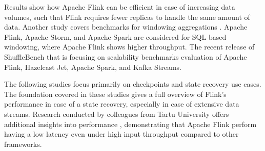 Results show how Apache Flink can be efficient in case of increasing data volumes,
such that Flink requires fewer replicas to handle the same amount of data.
Another study covers benchmarks for windowing aggregations \cite{dataSystemBenchmarks}.
Apache Flink, Apache Storm, and Apache Spark are considered for SQL-based windowing, where Apache Flink shows higher throughput.
The recent release of ShuffleBench \cite{Henning_2024} that is focusing on scalability
benchmarks evaluation of Apache Flink, Hazelcast Jet, Apache Spark, and Kafka Streams.

The following studies \cite{carbone2015lightweight} \cite{siachamis2024checkmate} focus
primarily on checkpoints and state recovery use cases.
The foundation covered in these studies gives a full overview of Flink's performance in
case of a state recovery, especially in case of extensive data streams.
Research conducted by colleagues from Tartu University offers additional insights into performance \cite{benchmarks_big_data},
demonstrating that Apache Flink perform having a low latency even under high input throughput compared to other frameworks.
